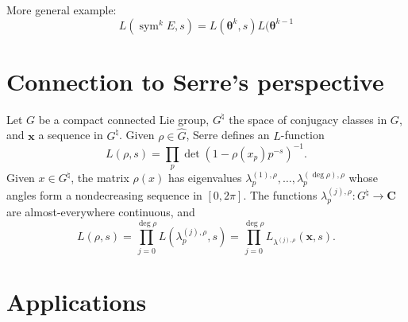 \documentclass{article}
\DeclareMathOperator{\sym}{sym}
\newcommand{\bC}{\mathbf{C}}
\newcommand{\btheta}{{\boldsymbol{\theta}}}
\newcommand{\bx}{\boldsymbol{x}}
\theoremstyle{definition}
\begin{document}
More general example:
\[
	L(\sym^k E,s) = L(\btheta^k, s) L(\btheta^{k-1}
\]





\section{Connection to Serre's perspective}

Let $G$ be a compact connected Lie group, $G^\natural$ the space of conjugacy 
classes in $G$, and $\bx$ a sequence in $G^\natural$. Given 
$\rho\in \widehat G$, Serre defines an $L$-function 
\[
	L(\rho,s) =\prod_p \det(1-\rho(x_p)p^{-s})^{-1} .
\]
Given $x\in G^\natural$, the matrix $\rho(x)$ has eigenvalues 
$\lambda_p^{(1),\rho},\dots,\lambda_p^{(\deg\rho),\rho}$ whose angles form a 
nondecreasing sequence in $[0,2\pi]$. The functions 
$\lambda_p^{(j),\rho}\colon G^\natural\to \bC$ are almost-everywhere 
continuous, and 
\[
	L(\rho,s) = \prod_{j=0}^{\deg\rho} L(\lambda_p^{(j),\rho},s) = \prod_{j=0}^{\deg\rho} L_{\lambda^{(j),\rho}}(\bx,s).
\]





\section{Applications}\label{sec:application}





\printbibliography
\end{document}
